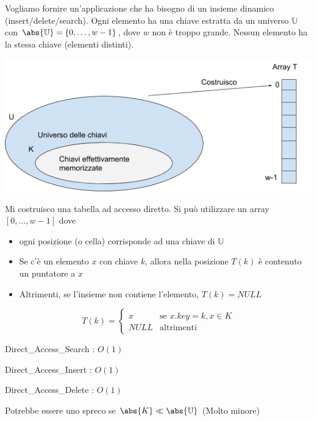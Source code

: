 \documentclass{article}
\providecommand{\tightlist}{%
  \setlength{\itemsep}{0pt}\setlength{\parskip}{0pt}}
\begin{document}
{Vogliamo fornire un'applicazione che ha bisogno di un insieme dinamico (insert/delete/search). Ogni elemento ha una chiave estratta da un universo $\mathbb{U}$ con $\abs{\mathbb{U}} = \{0,\ldots,w-1\}$, dove $w$ non è troppo grande. Nessun elemento ha la stessa chiave (elementi distinti). }

{\includegraphics{images/image521.png}}

{Mi costruisco una tabella ad accesso diretto. Si può utilizzare un array $[0,\ldots,w-1]$ dove}

\begin{itemize}
\tightlist
\item
  {ogni posizione (o cella) corrisponde ad una chiave di $\mathbb{U}$}
\item
  {Se c'è un elemento $x$ con chiave $k$, allora nella posizione $T(k)$ è contenuto un puntatore a $x$}
\item
  {Altrimenti, se l'insieme non contiene l'elemento, $T(k) = NULL$}
\end{itemize}

\begin{equation}
T(k) = 
\begin{cases}
x & \mbox{se } x.key=k, x\in K \\ 
NULL & \mbox{altrimenti} 
\end{cases}
\end{equation}

{Direct\_Access\_Search : }$O(1)$



{Direct\_Access\_Insert : $O(1)$}



{Direct\_Access\_Delete : $O(1)$}



{Potrebbe essere uno spreco se $\abs{K} \ll \abs{\mathbb{U}}$ (Molto minore)}
\end{document}
